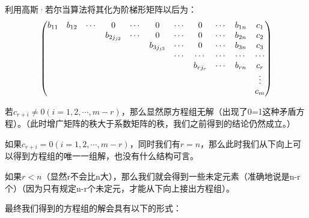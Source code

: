 \documentclass[a4paper]{ctexart}
\begin{document}
利用高斯·若尔当算法将其化为阶梯形矩阵以后为：
$$
\setcounter{MaxMatrixCols}{20}
\begin{pmatrix}
b_{11}&b_{12}&\cdots&0&\cdots&0&\cdots&0&\cdots&b_{1n}&c_{1}\\
&&&b_{2j_{j2}}&\cdots&0&\cdots&0&\cdots&b_{2n}&c_{2}\\
&&&&&b_{3j_{j3}}&\cdots&0&\cdots&b_{3n}&c_{3}\\
&&&&&&\cdots&\cdots&\cdots&\cdots&\cdots\\
&&&&&&&b_{rj_{r}}&\cdots&b_{rn}&c_{r}\\
&&&&&&&&&&\vdots\\
&&&&&&&&&&c_{m}\\
\end{pmatrix}
$$

若$c_{r+i}\neq 0 (i=1,2,\cdots,m-r)$，那么显然原方程组无解（出现了0=1这种矛盾方程）。（此时增广矩阵的秩大于系数矩阵的秩，我们之前得到的结论仍然成立。）

如果$c_{r+i}= 0 (i=1,2,\cdots,m-r)$，同时我们有$r=n$，那么此时我们从下向上可以得到方程组的唯一一组解，也没有什么结构可言。

如果$r<n$（显然r不会比n大），那么我们就会得到一些未定元素（准确地说是n-r个）（因为只有规定n-r个未定元，才能从下向上接出方程组）。

最终我们得到的方程组的解会具有以下的形式：
\end{document}
